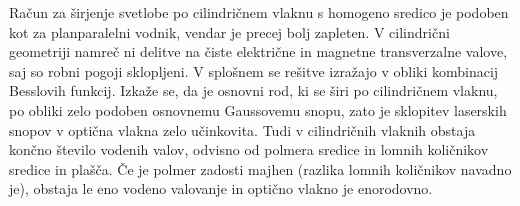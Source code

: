 Račun za širjenje svetlobe po cilindričnem vlaknu s homogeno sredico
je podoben kot za planparalelni vodnik, vendar je precej bolj
zapleten. V cilindrični geometriji namreč ni delitve na čiste električne in 
magnetne transverzalne valove, saj so robni pogoji sklopljeni. V splošnem se rešitve izražajo 
v obliki kombinacij Besslovih funkcij. Izkaže se, da je osnovni rod, ki se  širi po
cilindričnem vlaknu, po obliki zelo podoben osnovnemu Gaussovemu snopu, zato je sklopitev
laserskih snopov v optična vlakna zelo učinkovita.
Tudi v cilindričnih vlaknih obstaja končno število vodenih valov, odvisno od polmera sredice in
lomnih količnikov sredice in plašča. Če je polmer zadosti majhen (razlika lomnih
količnikov navadno je), obstaja le eno vodeno valovanje in optično vlakno je 
enorodovno.

